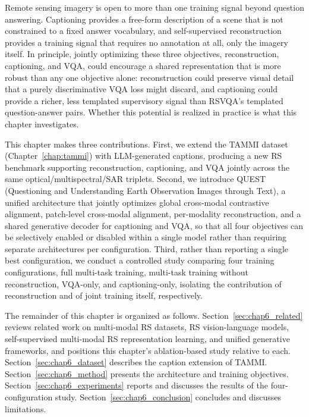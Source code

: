 Remote sensing imagery is open to more than one training signal
beyond question answering. Captioning provides a free-form description
of a scene that is not constrained to a fixed answer vocabulary, and
self-supervised reconstruction provides a training signal that requires
no annotation at all, only the imagery itself. In principle, jointly
optimizing these three objectives, reconstruction, captioning, and VQA,
could encourage a shared representation that is more robust than any
one objective alone: reconstruction could preserve visual detail that a
purely discriminative VQA loss might discard, and captioning could
provide a richer, less templated supervisory signal than RSVQA's
templated question-answer pairs. Whether this potential is realized in
practice is what this
chapter investigates.

This chapter makes three contributions. First, we extend the TAMMI
dataset (Chapter~\ref{chap:tammi}) with LLM-generated captions,
producing a new RS benchmark supporting
reconstruction, captioning, and VQA jointly across the same
optical/multispectral/SAR triplets. Second, we introduce QUEST
(Questioning and Understanding Earth Observation Images
through Text), a unified
architecture that jointly optimizes global cross-modal contrastive
alignment, patch-level cross-modal alignment, per-modality
reconstruction, and a shared generative decoder for captioning and VQA,
so that all four objectives can be selectively enabled or disabled
within a single model rather than requiring separate architectures per
configuration. Third, rather than reporting a single best configuration,
we conduct a controlled study comparing four training configurations,
full multi-task training, multi-task training without reconstruction,
VQA-only, and captioning-only, isolating the contribution of
reconstruction and of joint training itself, respectively.

The remainder of this chapter is organized as follows.
Section~\ref{sec:chap6_related} reviews related work on multi-modal RS
datasets, RS vision-language models, self-supervised multi-modal RS
representation learning, and unified generative frameworks, and
positions this chapter's ablation-based study relative to each.
Section~\ref{sec:chap6_dataset} describes the caption extension of
TAMMI. Section~\ref{sec:chap6_method} presents the architecture and
training objectives. Section~\ref{sec:chap6_experiments} reports and
discusses the results of the four-configuration study.
Section~\ref{sec:chap6_conclusion} concludes and discusses limitations.

